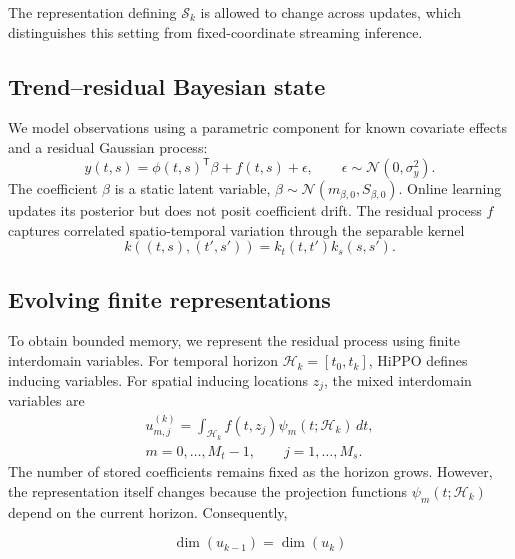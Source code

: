 \documentclass[twoside]{article}
\newcommand{\trans}{\mathsf T}
\begin{document}
The representation defining $\mathcal S_k$ is allowed to change across updates, which distinguishes this setting from fixed-coordinate streaming inference.

\subsection{Trend--residual Bayesian state}

We model observations using a parametric component for known covariate effects and a residual Gaussian process:
\begin{equation}
 y(t,s)=\phi(t,s)^{\trans}\beta+f(t,s)+\epsilon,
 \qquad \epsilon\sim\mathcal N(0,\sigma_y^2).
 \label{eq:intro-model}
\end{equation}
The coefficient $\beta$ is a static latent variable,
$\beta\sim\mathcal N(m_{\beta,0},S_{\beta,0})$. Online learning updates its posterior but does not posit coefficient drift. The residual process $f$ captures correlated spatio-temporal variation through the separable kernel
\begin{equation}
 k((t,s),(t',s'))=k_t(t,t')k_s(s,s').
 \label{eq:separable}
\end{equation}
\subsection{Evolving finite representations}

To obtain bounded memory, we represent the residual process using finite interdomain variables. For temporal horizon $\mathcal H_k=[t_0,t_k]$, HiPPO defines inducing variables. For spatial inducing locations $z_j$, the mixed interdomain variables are
\begin{multline}
 u_{m,j}^{(k)}=\int_{\mathcal H_k} f(t,z_j)\psi_m(t;\mathcal H_k)\,dt,
 \\
 m=0,\ldots,M_t-1,\qquad j=1,\ldots,M_s.
 \label{eq:hippo-functional}
\end{multline}
The number of stored coefficients remains fixed as the horizon grows. However, the representation itself changes because the projection functions $\psi_m(t;\mathcal H_k)$ depend on the current horizon. Consequently,

\[
\dim(u_{k-1})=\dim(u_k)
\]
\end{document}
